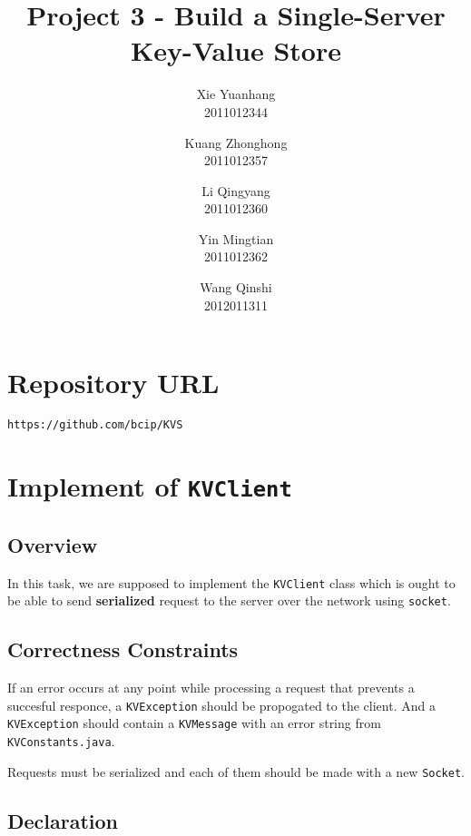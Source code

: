 \documentclass{article}
\title{Project 3 - Build a Single-Server Key-Value Store}
\author{
Xie Yuanhang  \\   2011012344\and
Kuang Zhonghong  \\   2011012357\and
Li Qingyang   \\   2011012360 \and
Yin Mingtian   \\   2011012362\and
Wang Qinshi   \\   2012011311}
\date{}
\begin{document}
\maketitle

\setcounter{section}{-1}
 \section{Repository URL}
\texttt{https://github.com/bcip/KVS}

\section{Implement of \texttt{KVClient}}
\subsection{Overview}
In this task, we are supposed to implement the \texttt{KVClient} class which is ought to be able to send \textbf{serialized} request to the server
over the network using \texttt{socket}.
\subsection{Correctness Constraints}
\begin{compactitem}
\item If an error occurs at any point while processing a request that prevents a succesful responce, a \texttt{KVException} should be propogated
	to the client. And a \texttt{KVException} should contain a \texttt{KVMessage} with an error string from \texttt{KVConstants.java}.
\item Requests must be serialized and each of them should be made with a new \texttt{Socket}.
\end{compactitem}
\subsection{Declaration}
\end{document}
